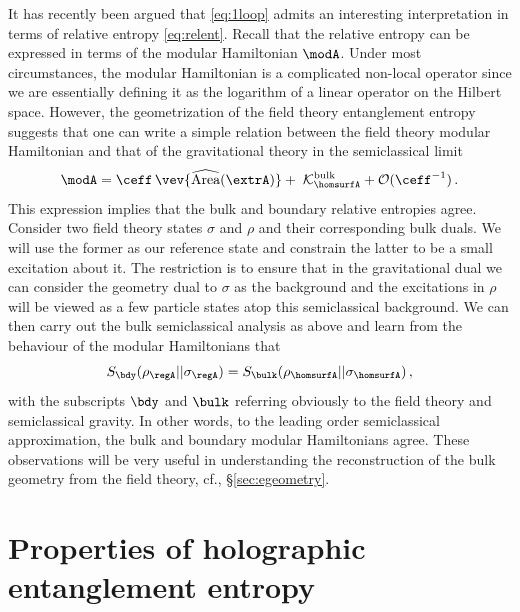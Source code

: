\documentclass[12pt,openany]{book}
\begin{document}
It has recently been argued that \eqref{eq:1loop} admits an interesting interpretation in terms of relative entropy \eqref{eq:relent}. Recall that the relative entropy can be expressed in terms of the modular Hamiltonian $\modA$. Under most circumstances,  the modular Hamiltonian is a complicated non-local operator since we are essentially defining it as the logarithm of a linear operator on the Hilbert space. However, the geometrization of the field theory entanglement entropy suggests that one can write a simple relation between the field theory modular Hamiltonian and that of the gravitational theory in the semiclassical limit \cite{Jafferis:2015del}
%
\begin{equation}
\modA =\ceff\, \vev{\widehat{\text{Area}}(\extrA)} +\;  {\cal K}_{\homsurfA}^\text{bulk} + {\cal O}(\ceff^{-1}) \,.
\label{eq:jlms1}
\end{equation}
%
This expression implies that the bulk and boundary relative entropies agree. Consider two field theory states $\sigma$  and $\rho$
and their corresponding bulk duals. We will use the former as our reference state and constrain the latter to be a small excitation about it. The restriction is to ensure that in the gravitational dual we can consider  the geometry dual to $\sigma$ as the background and the excitations in $\rho$ will be viewed as a few particle states atop this semiclassical background. We can then carry out the bulk semiclassical analysis as above and learn from the behaviour of the modular Hamiltonians that
%
\begin{equation}
S_\bdy(\rho_\regA||\sigma_\regA) = S_\bulk(\rho_{\homsurfA}||\sigma_{\homsurfA}) \,,
\label{}
\end{equation}
%
with the subscripts $\bdy$ and $\bulk $ referring obviously to the field theory and semiclassical gravity.
In other words, to the leading order semiclassical approximation, the bulk and boundary modular Hamiltonians agree. These observations will be very useful in understanding the reconstruction of the bulk geometry from the field theory, cf.,
\S\ref{sec:egeometry}.


\chapter{Properties of holographic entanglement entropy}
\label{sec:heeprops}
\end{document}
